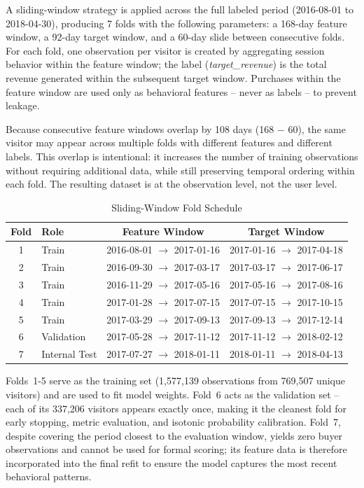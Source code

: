 \documentclass[conference]{IEEEtran}
\begin{document}
A sliding-window strategy is applied across the full labeled period
(2016-08-01 to 2018-04-30), producing 7 folds with the following
parameters: a 168-day feature window, a 92-day
target window, and a 60-day slide between consecutive
folds. For each fold, one observation per visitor is created by
aggregating session behavior within the feature window; the label
(\textit{target\_revenue}) is the total revenue generated within
the subsequent target window. Purchases within the feature window
are used only as behavioral features -- never as labels -- to
prevent leakage.

Because consecutive feature windows overlap by 108 days
(168 $-$ 60), the same visitor may appear across multiple folds
with different features and different labels.
This overlap is intentional: it increases the number of training
observations without requiring additional data, while still
preserving temporal ordering within each fold.
The resulting dataset is at the observation level, not
the user level.

\begin{table}[H]
\centering
\caption{Sliding-Window Fold Schedule}
\label{tab:folds}
\renewcommand{\arraystretch}{1.2}
\setlength{\tabcolsep}{3pt}
\scriptsize
\begin{tabular}{|c l c c|}
\hline
\textbf{Fold} & \textbf{Role} & \textbf{Feature Window}
  & \textbf{Target Window} \\
\hline
1 & Train & 2016-08-01 $\to$ 2017-01-16 & 2017-01-16 $\to$ 2017-04-18 \\
2 & Train & 2016-09-30 $\to$ 2017-03-17 & 2017-03-17 $\to$ 2017-06-17 \\
3 & Train & 2016-11-29 $\to$ 2017-05-16 & 2017-05-16 $\to$ 2017-08-16 \\
4 & Train & 2017-01-28 $\to$ 2017-07-15 & 2017-07-15 $\to$ 2017-10-15 \\
5 & Train & 2017-03-29 $\to$ 2017-09-13 & 2017-09-13 $\to$ 2017-12-14 \\
6 & Validation & 2017-05-28 $\to$ 2017-11-12
  & 2017-11-12 $\to$ 2018-02-12 \\
7 & Internal Test & 2017-07-27 $\to$ 2018-01-11
  & 2018-01-11 $\to$ 2018-04-13 \\
\hline
\end{tabular}
\end{table}

Folds~1-5 serve as the training set (1,577,139 observations from
769,507 unique visitors) and are used to fit model weights.
Fold~6 acts as the validation set -- each of its 337,206 visitors
appears exactly once, making it the cleanest fold for early stopping,
metric evaluation, and isotonic probability calibration.
Fold~7, despite covering the period closest to the evaluation window,
yields zero buyer observations and cannot be used for formal scoring;
its feature data is therefore incorporated into the final refit to
ensure the model captures the most recent behavioral patterns.
\end{document}
